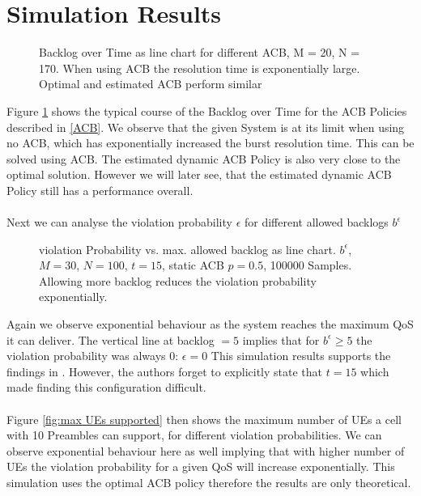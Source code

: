 \documentclass[conference]{IEEEtran}
\begin{document}
\section{Simulation Results}
\begin{figure}
\resizebox{\columnwidth}{!}{}
    \caption{Backlog over Time as line chart for different ACB, M = 20, N = 170. When using ACB the resolution time is exponentially large. Optimal and estimated ACB perform similar}\label{fig:backlog}
\end{figure}
Figure \ref{fig:backlog} shows the typical course of the Backlog over Time for the ACB Policies described in \ref{ACB}.
We observe that the given System is at its limit when using no ACB, which has exponentially increased the burst resolution time.
This can be solved using ACB. The estimated dynamic ACB Policy is also very close to the optimal solution. However we will later see, that the estimated dynamic ACB Policy still has a performance overall.\\\\
Next we can analyse the violation probability $\epsilon$ for different allowed backlogs $b^\epsilon$
\begin{figure}
\resizebox{\columnwidth}{!}{}
    \caption{violation Probability vs. max. allowed backlog as line chart. $b^\epsilon$,  $M = 30$, $N = 100$, $t = 15$, static ACB $p=0.5$, 100000 Samples.\\Allowing more backlog reduces the violation probability exponentially.}\label{fig:violation prob}
\end{figure}
Again we observe exponential behaviour as the system reaches the maximum QoS it can deliver.
The vertical line at backlog $= 5$ implies that for $b^\epsilon\geq 5$ the violation probability was always 0: $\epsilon = 0$
This simulation results supports the findings in \cite{8422323}.
However, the authors forget to explicitly state that $t = 15$ which made finding this configuration difficult.\\\\
Figure \ref{fig:max UEs supported} then shows the maximum number of UEs a cell with 10 Preambles can support, for different violation probabilities.
We can observe exponential behaviour here as well implying that with higher number of UEs the violation probability for a given QoS will increase exponentially.
This simulation uses the optimal ACB policy therefore the results are only theoretical.\\\\
\end{document}
